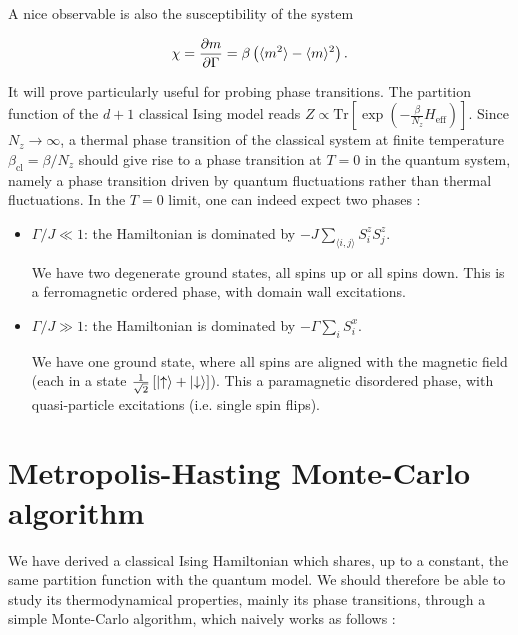 \documentclass[11pt,openany]{article}
\begin{document}
A nice observable is also the susceptibility of the system

\begin{equation}
	\chi = \frac{\partial m}{\partial\Gamma} = \beta\left(\langle m^2\rangle - \langle m\rangle^2\right).
\end{equation}

It will prove particularly useful for probing phase transitions. The partition function of the $d+1$ classical Ising model reads $Z\propto\mathrm{Tr}\left[\exp\left(-\frac{\beta}{N_z}H_\mathrm{eff}\right)\right]$. Since $N_z\to\infty$, a thermal phase transition of the classical system at finite temperature $\beta_{\mathrm{cl}}=\beta/N_z$ should give rise to a phase transition at $T=0$ in the quantum system, namely a phase transition driven by quantum fluctuations rather than thermal fluctuations. In the $T=0$ limit, one can indeed expect two phases \cite{Vasseur}:

\begin{itemize}
	
	\item $\Gamma/J \ll 1$: the Hamiltonian is dominated by $\displaystyle-J\sum_{\langle i,j\rangle}S^z_iS^z_j$.
	
	We have two degenerate ground states, all spins up or all spins down. This is a ferromagnetic ordered phase, with domain wall excitations.
	
	\item $\Gamma/J \gg 1$: the Hamiltonian is dominated by $\displaystyle-\Gamma\sum_iS^x_i$.
	
	We have one ground state, where all spins are aligned with the magnetic field (each in a state $\frac{1}{\sqrt{2}}\left[\ket{\uparrow}+\ket{\downarrow}\right]$). This a paramagnetic disordered phase, with quasi-particle excitations (i.e. single spin flips).
	
\end{itemize}


\section{Metropolis-Hasting Monte-Carlo algorithm}

We have derived a classical Ising Hamiltonian which shares, up to a constant, the same partition function with the quantum model. We should therefore be able to study its thermodynamical properties, mainly its phase transitions, through a simple Monte-Carlo algorithm, which naively works as follows \cite{Binder}:
\end{document}
